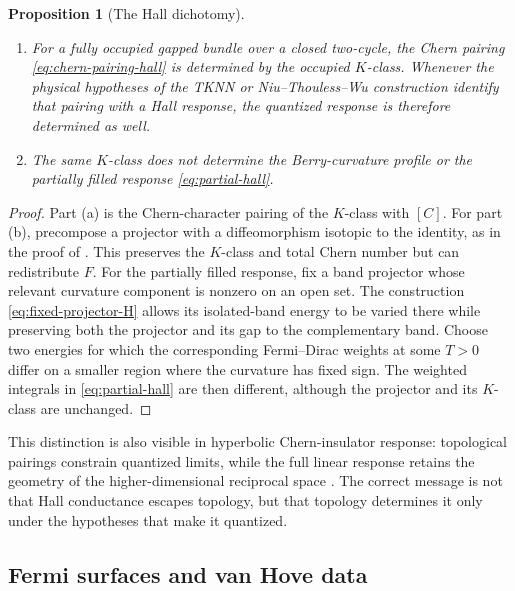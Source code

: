 \documentclass[11pt]{article}
\newtheorem{proposition}[theorem]{Proposition}
\theoremstyle{definition}
\theoremstyle{remark}
\begin{document}
\begin{proposition}[The Hall dichotomy]
\label{prop:hall-dichotomy}
\begin{enumerate}[label=\textup{(\alph*)},leftmargin=2.5em]
\item For a fully occupied gapped bundle over a closed two-cycle, the Chern
  pairing \eqref{eq:chern-pairing-hall} is determined by the occupied
  \(K\)-class.  Whenever the physical hypotheses of the TKNN or
  Niu--Thouless--Wu construction identify that pairing with a Hall response,
  the quantized response is therefore determined as well.
\item The same \(K\)-class does not determine the Berry-curvature profile or
  the partially filled response \eqref{eq:partial-hall}.
\end{enumerate}
\end{proposition}

\begin{proof}
Part \textup{(a)} is the Chern-character pairing of the \(K\)-class with
\([C]\).  For part \textup{(b)}, precompose a projector with a diffeomorphism
isotopic to the identity, as in the proof of
.  This preserves the \(K\)-class and total Chern number
but can redistribute \(F\).  For the partially filled response, fix a band
projector whose relevant curvature component is nonzero on an open set.
The construction \eqref{eq:fixed-projector-H} allows its isolated-band energy
to be varied there while preserving both the projector and its gap to the
complementary band.  Choose two energies for which the corresponding
Fermi--Dirac weights at some \(T>0\) differ on a smaller region where the
curvature has fixed sign.  The weighted integrals in
\eqref{eq:partial-hall} are then different, although the projector and its
\(K\)-class are unchanged.
\end{proof}

This distinction is also visible in hyperbolic Chern-insulator response:
topological pairings constrain quantized limits, while the full linear
response retains the geometry of the higher-dimensional reciprocal space
\cite{SunEtAl2024}.  The correct message is not that Hall conductance escapes
topology, but that topology determines it only under the hypotheses that make
it quantized.

\subsection{Fermi surfaces and van Hove data}
\end{document}

